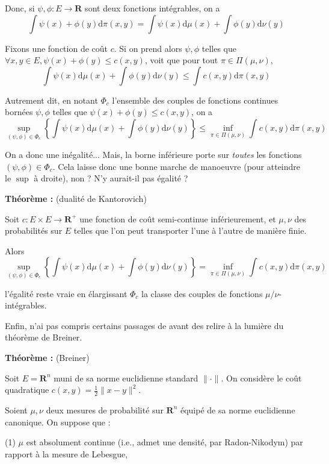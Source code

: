 \documentclass[12pt]{article}
\begin{document}
Donc, si $ \psi, \phi : E \to \mathbf R $ sont deux fonctions intégrables, on a $$ \int \psi(x) + \phi(y) \mathrm d \pi (x,y) = \int \psi(x)  \mathrm d \mu (x)  + \int \phi(y) \mathrm d \nu (y) $$

Fixons une fonction de coût $c$. Si on prend alors $ \psi, \phi $ telles que $ \forall x,y \in E, \psi(x) + \phi(y) \leqslant c(x,y) $, voit que pour tout $ \pi \in \Pi(\mu,\nu) $, $$ \int \psi(x)  \mathrm d \mu (x) + \int \phi(y) \mathrm d \nu (y) \leqslant \int c(x,y) \mathrm d \pi (x,y) $$

Autrement dit, en notant $ \Phi_c $ l'ensemble des couples de fonctions continues bornées $ \psi, \phi $ telles que $ \psi(x) + \phi(y) \leqslant c(x,y) $, on a $$ \sup_{(\psi,\phi) \in \Phi_c} \left\{  \int \psi(x) \mathrm d \mu (x) + \int \phi(y) \mathrm d \nu (y) \right\} \leqslant \inf_{\pi \in \Pi(\mu,\nu) } \int c(x,y) \mathrm d \pi (x,y) $$

On a donc une inégalité... Mais, la borne inférieure porte sur \textit{toutes} les fonctions $ (\psi, \phi) \in \Phi_c $. Cela laisse donc une bonne marche de manoeuvre (pour atteindre le $ \sup $ à droite), non ? N'y aurait-il pas égalité ?

\textbf{Théorème :} (dualité de Kantorovich)

Soit $c : E \times E \to \mathbf R^+ $ une fonction de coût semi-continue inférieurement, et $ \mu, \nu $ des probabilités sur $E$ telles que l'on peut transporter l'une à l'autre de manière finie.

Alors $$ \sup_{(\psi,\phi) \in \Phi_c} \left\{  \int \psi(x) \mathrm d \mu (x) + \int \phi(y) \mathrm d \nu (y) \right\} = \inf_{\pi \in \Pi(\mu,\nu) } \int c(x,y) \mathrm d \pi (x,y) $$

l'égalité reste vraie en élargissant $ \Phi_c $ la classe des couples de fonctions $ \mu/\nu $-intégrables.

Enfin, n'ai pas compris certains passages de \cite{DecreusefondMoroz2021} avant des relire à la lumière du théorème de Breiner.

\textbf{Théorème :} (Breiner)

Soit $E = \mathbf R^n $ muni de sa norme euclidienne standard $ \| \cdot \| $. On considère le coût quadratique $ c(x,y) = \frac 1 2 \| x - y\|^2$. 

Soient $\mu, \nu$ deux mesures de probabilité sur $ \mathbf R^n $ équipé de sa norme euclidienne canonique. On suppose que :

(1) $ \mu $ est absolument continue (i.e., admet une densité, par Radon-Nikodym) par rapport à la mesure de Lebesgue, 
\end{document}
